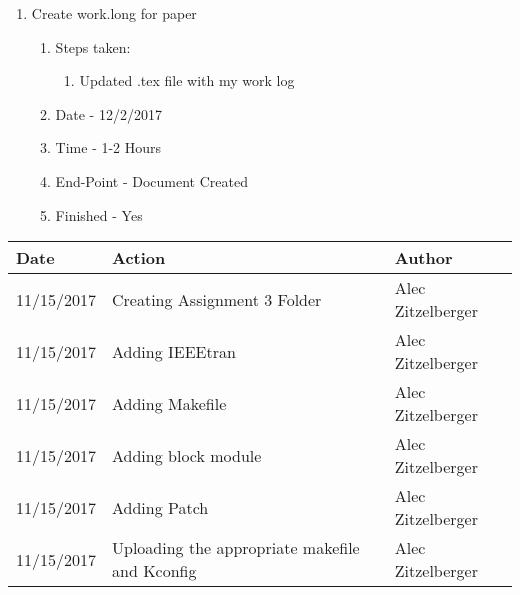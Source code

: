 \documentclass[journal,10pt,onecolumn,compsoc]{IEEEtran} \usepackage[margin=1.0in]{geometry} \usepackage{pdfpages}
\begin{document}
    \begin {enumerate}
    	\item Create work.long for paper
        \begin{enumerate}
            \item Steps taken:
        	\begin{enumerate}
                  \item Updated .tex file with my work log
     		\end{enumerate}   
            \item Date - 12/2/2017
            \item Time - 1-2 Hours
            \item End-Point - Document Created
            \item Finished - Yes \\
        \end{enumerate}
	\end{enumerate}
%
\pagebreak

\begin{table}
  \begin{tabular}{|l|l|l|}
  \hline
  Date & Action & Author \\ \hline
 11/15/2017 & Creating Assignment 3 Folder & Alec Zitzelberger \\ 
 11/15/2017  & Adding IEEEtran & Alec Zitzelberger \\ 
 11/15/2017 & Adding Makefile & Alec Zitzelberger \\ 
 11/15/2017 & Adding block module & Alec Zitzelberger \\ 
 11/15/2017 & Adding Patch & Alec Zitzelberger \\ 
 11/15/2017 & Uploading the appropriate makefile and Kconfig & Alec Zitzelberger \\ 
  \hline
  \end{tabular}
  \end{table}

 
\end{document}
